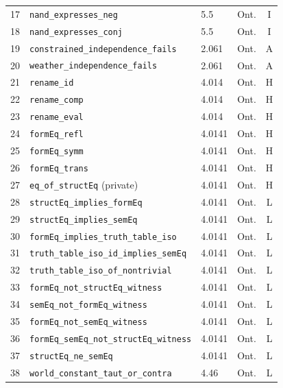\documentclass[jsl,bibother]{asl}
\theoremstyle{definition}
\theoremstyle{remark}
\begin{document}
\begin{table}[p]
\begin{tabular}{@{}rlllc@{}}
17 & \texttt{nand\_expresses\_neg}                       & 5.5     & Ont. & I \\
18 & \texttt{nand\_expresses\_conj}                      & 5.5     & Ont. & I \\
19 & \texttt{constrained\_independence\_fails}           & 2.061   & Ont. & A \\
20 & \texttt{weather\_independence\_fails}               & 2.061   & Ont. & A \\
21 & \texttt{rename\_id}                                 & 4.014   & Ont. & H \\
22 & \texttt{rename\_comp}                               & 4.014   & Ont. & H \\
23 & \texttt{rename\_eval}                               & 4.014   & Ont. & H \\
24 & \texttt{formEq\_refl}                               & 4.0141  & Ont. & H \\
25 & \texttt{formEq\_symm}                               & 4.0141  & Ont. & H \\
26 & \texttt{formEq\_trans}                              & 4.0141  & Ont. & H \\
27 & \texttt{eq\_of\_structEq} (private)                 & 4.0141  & Ont. & H \\
28 & \texttt{structEq\_implies\_formEq}                  & 4.0141  & Ont. & L \\
29 & \texttt{structEq\_implies\_semEq}                   & 4.0141  & Ont. & L \\
30 & \texttt{formEq\_implies\_truth\_table\_iso}         & 4.0141  & Ont. & L \\
31 & \texttt{truth\_table\_iso\_id\_implies\_semEq}      & 4.0141  & Ont. & L \\
32 & \texttt{truth\_table\_iso\_of\_nontrivial}          & 4.0141  & Ont. & L \\
33 & \texttt{formEq\_not\_structEq\_witness}             & 4.0141  & Ont. & L \\
34 & \texttt{semEq\_not\_formEq\_witness}                & 4.0141  & Ont. & L \\
35 & \texttt{formEq\_not\_semEq\_witness}                & 4.0141  & Ont. & L \\
36 & \texttt{formEq\_semEq\_not\_structEq\_witness}      & 4.0141  & Ont. & L \\
37 & \texttt{structEq\_ne\_semEq}                        & 4.0141  & Ont. & L \\
38 & \texttt{world\_constant\_taut\_or\_contra}          & 4.46    & Ont. & L \\

\end{tabular}
\end{table}
\end{document}
